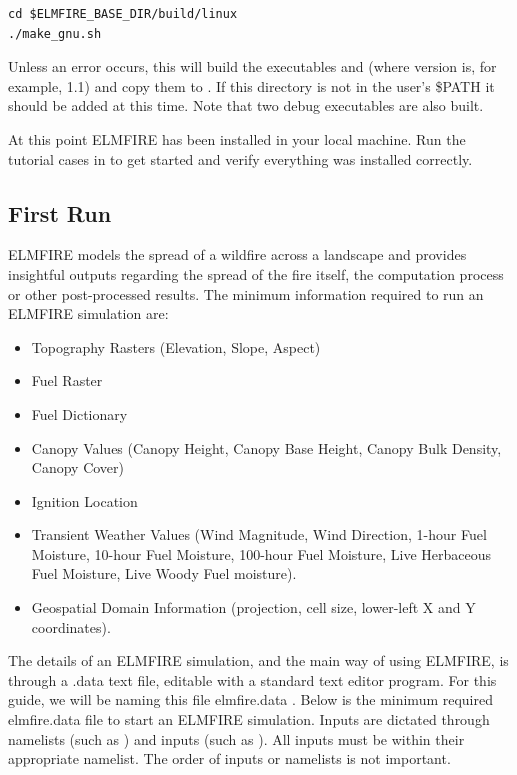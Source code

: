 \begin{verbatim}
cd $ELMFIRE_BASE_DIR/build/linux
./make_gnu.sh
\end{verbatim}

Unless an error occurs, this will build the executables  and  (where version is, for example, 1.1) and copy them to . If this directory is not in the user’s \$PATH it should be added at this time. Note that two debug executables are also built.

At this point ELMFIRE has been installed in your local machine. Run the tutorial cases in  to get started and verify everything was installed correctly.

\subsection{First Run}

ELMFIRE models the spread of a wildfire across a landscape and provides insightful outputs regarding the spread of the fire itself, the computation process or other post-processed results. The minimum information required to run an ELMFIRE simulation are:

\begin{itemize}
    \item Topography Rasters (Elevation, Slope, Aspect)
    \item Fuel Raster 
    \item Fuel Dictionary
    \item Canopy Values (Canopy Height, Canopy Base Height, Canopy Bulk Density, Canopy Cover)
    \item Ignition Location
    \item Transient Weather Values (Wind Magnitude, Wind Direction, 1-hour Fuel Moisture, 10-hour Fuel Moisture, 100-hour Fuel Moisture, Live Herbaceous Fuel Moisture, Live Woody Fuel moisture).
    \item Geospatial Domain Information (projection, cell size, lower-left X and Y coordinates).
\end{itemize}

The details of an ELMFIRE simulation, and the main way of using ELMFIRE, is through a .data text file, editable with a standard text editor program. For this guide, we will be naming this file elmfire.data . Below is the minimum required elmfire.data file to start an ELMFIRE simulation. Inputs are dictated through namelists (such as ) and inputs (such as ). All inputs must be within their appropriate namelist. The order of inputs or namelists is not important. 

